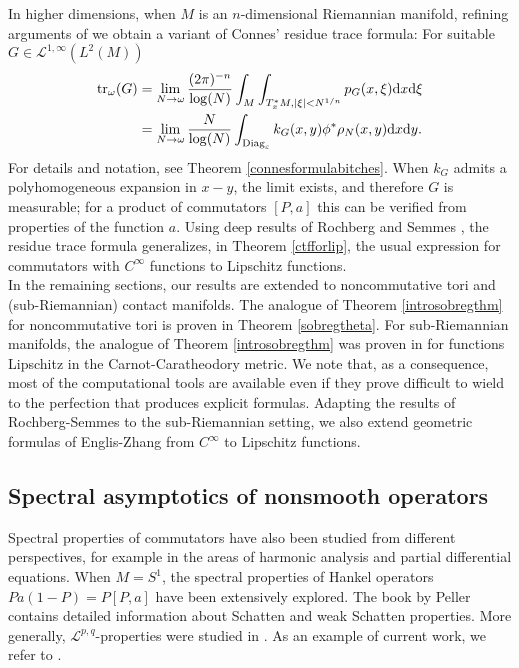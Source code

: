 \documentclass[10pt]{amsart}
\theoremstyle{remark}
\theoremstyle{definition}
\begin{document}
In higher dimensions, when $M$ is an $n$-dimensional Riemannian manifold, refining arguments of \cite{sukolord} we obtain a variant of Connes' residue trace formula: For suitable $G\in \mathcal{L}^{1,\infty}(L^2(M))$ 
\begin{align*}
{\mathrm{t}\mathrm{r}}_\omega(G)&=\lim_{N\to \omega}\frac{(2\pi)^{-n}}{\log(N)} \int_M\int_{T^*_xM, |\xi|<N^{1/n}} p_G(x,\xi){\mathrm{d}} x{\mathrm{d}} \xi\\
&=\lim_{N\to \omega}\frac{N}{\log(N)}\int_{\textnormal{Diag}_{\varepsilon}} k_G(x,y)\phi^*\rho_N(x,y){\mathrm{d}} x{\mathrm{d}} y.
\end{align*}
For details and notation, see Theorem \ref{connesformulabitches}. When $k_G$ admits a polyhomogeneous expansion in $x-y$, the limit exists, and therefore $G$ is measurable; for a product of commutators $[P,a]$ this can be verified from properties of the function $a$. Using deep results of Rochberg and Semmes \cite{rochbergsemmes}, the residue trace formula generalizes, in Theorem \ref{ctfforlip}, the usual expression for commutators with $C^\infty$ functions to Lipschitz functions.\\

In the remaining sections, our results are extended to noncommutative tori and (sub-Riemannian) contact manifolds. The analogue of Theorem \ref{introsobregthm} for noncommutative tori is proven in Theorem \ref{sobregtheta}. For sub-Riemannian manifolds, the analogue of Theorem \ref{introsobregthm} was proven in \cite[Section 4]{gimpgoff} for functions Lipschitz in the Carnot-Caratheodory metric. We note that, as a consequence, most of the computational tools are available even if they prove difficult to wield to the perfection that produces explicit formulas. Adapting the results of Rochberg-Semmes to the sub-Riemannian setting, we also extend geometric formulas of Englis-Zhang \cite{engzh} from $C^\infty$ to Lipschitz functions. 

 
\subsection{Spectral asymptotics of nonsmooth operators}

Spectral properties of commutators have also been studied from different perspectives, for example in the areas of harmonic analysis and partial differential equations. When $M=S^1$, the spectral properties of Hankel operators $Pa(1-P)=P[P,a]$ have been extensively explored. The book \cite{peller} by Peller contains detailed information about Schatten and weak Schatten properties. More generally, $\mathcal{L}^{p,q}$-properties were studied in \cite[Chapter 6.4]{peller}. As an example of current work, we refer to \cite{pushya}. 
\end{document}
